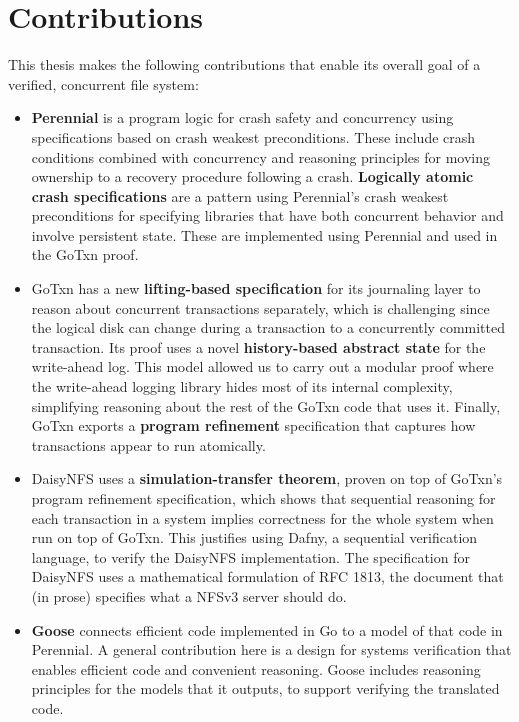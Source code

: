 \section{Contributions}
\label{sec:intro:contributions}

This thesis makes the following contributions that enable its overall goal of a
verified, concurrent file system:

\begin{itemize}
  \item \textbf{Perennial} is a program logic for crash safety
        and concurrency using specifications based on crash weakest
        preconditions. These include crash conditions combined with concurrency
        and reasoning principles for moving ownership to a recovery procedure
        following a crash. \textbf{Logically atomic crash specifications} are a
        pattern using Perennial's crash weakest preconditions for specifying
        libraries that have both concurrent behavior and involve persistent
        state. These are implemented using Perennial and used in the GoTxn
        proof.
  \item GoTxn has a new \textbf{lifting-based specification} for its journaling
        layer to reason about concurrent transactions separately, which is
        challenging since the logical disk can change during a transaction to a
        concurrently committed transaction. Its proof uses a novel
        \textbf{history-based abstract state} for the write-ahead log. This model allowed us to carry
        out a modular proof where the write-ahead logging library hides most of
        its internal complexity, simplifying reasoning about the rest of the GoTxn
        code that uses it. Finally, GoTxn exports a \textbf{program refinement}
        specification that captures how transactions appear to run atomically.
  \item DaisyNFS uses a \textbf{simulation-transfer theorem}, proven on top of
        GoTxn's program refinement specification, which shows that sequential
        reasoning for each transaction in a system implies correctness for the
        whole system when run on top of GoTxn. This justifies using Dafny, a
        sequential verification language, to verify the DaisyNFS implementation.
        The specification for DaisyNFS uses a mathematical formulation of RFC
        1813, the document that (in prose) specifies what a NFSv3 server should
        do.
  \item \textbf{Goose} connects efficient code implemented in Go to a model of
        that code in Perennial. A general contribution here is a design for
        systems verification that enables efficient code and convenient
        reasoning. Goose includes reasoning principles for the models that it
        outputs, to support verifying the translated code.
\end{itemize}

